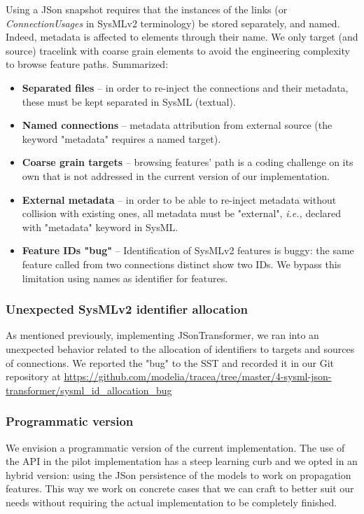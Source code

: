 Using a JSon snapshot requires that the instances of the links (or \textit{ConnectionUsages} in SysMLv2 terminology) be stored separately, and named. Indeed, metadata is affected to elements through their name. We only target (and source) tracelink with coarse grain elements to avoid the engineering complexity to browse feature paths. 
Summarized:
\begin{itemize}
    \item \textbf{Separated files} -- in order to re-inject the connections and their metadata, these must be kept separated in SysML (textual).
    \item \textbf{Named connections} -- metadata attribution from external source (the keyword "metadata" requires a named target).
    \item \textbf{Coarse grain targets} -- browsing features' path is a coding challenge on its own that is not addressed in the current version of our implementation.
    \item \textbf{External metadata} -- in order to be able to re-inject metadata without collision with existing ones, all metadata must be "external", \textit{i.e.,} declared with "metadata" keyword in SysML.
    \item \textbf{Feature IDs "bug"} -- Identification of SysMLv2 features is buggy: the same feature called from two connections distinct show two IDs. We bypass this limitation using names as identifier for features.
\end{itemize}

\subsubsection{Unexpected SysMLv2 identifier allocation}
As mentioned previously, implementing JSonTransformer, we ran into an unexpected behavior related to the allocation of identifiers to targets and sources of connections. We reported the "bug" to the SST and recorded it in our Git repository at \url{https://github.com/modelia/tracea/tree/master/4-sysml-json-transformer/sysml_id_allocation_bug}

\subsubsection{Programmatic version}

We envision a programmatic version of the current implementation. The use of the API in the pilot implementation has a steep learning curb and we opted in an hybrid version: using the JSon persistence of the models to work on propagation features. This way we work on concrete cases that we can craft to better suit our needs without requiring the actual implementation to be completely finished.

